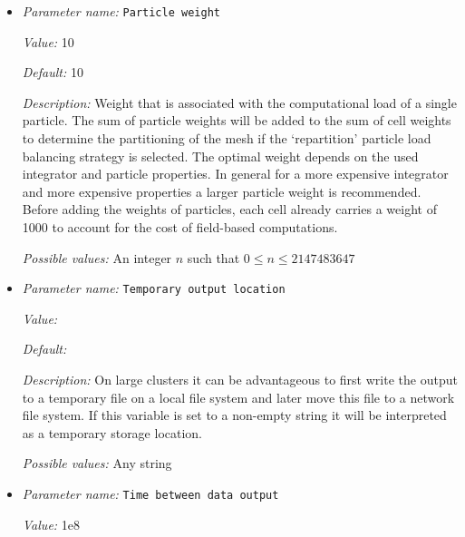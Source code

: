 \begin{itemize}
{\it Possible values:} Any one of ascii file, probability density function, quadrature points, random uniform, reference cell, uniform box, uniform radial
\item {\it Parameter name:} {\tt Particle weight}
\label{parameters:Postprocess/Particles/Particle weight}
\label{parameters:Postprocess/Particles/Particle_20weight}


{\it Value:} 10


{\it Default:} 10


{\it Description:} Weight that is associated with the computational load of a single particle. The sum of particle weights will be added to the sum of cell weights to determine the partitioning of the mesh if the `repartition' particle load balancing strategy is selected. The optimal weight depends on the used integrator and particle properties. In general for a more expensive integrator and more expensive properties a larger particle weight is recommended. Before adding the weights of particles, each cell already carries a weight of 1000 to account for the cost of field-based computations.


{\it Possible values:} An integer $n$ such that $0\leq n \leq 2147483647$
\item {\it Parameter name:} {\tt Temporary output location}
\label{parameters:Postprocess/Particles/Temporary output location}
\label{parameters:Postprocess/Particles/Temporary_20output_20location}


{\it Value:} 


{\it Default:} 


{\it Description:} On large clusters it can be advantageous to first write the output to a temporary file on a local file system and later move this file to a network file system. If this variable is set to a non-empty string it will be interpreted as a temporary storage location.


{\it Possible values:} Any string
\item {\it Parameter name:} {\tt Time between data output}
\label{parameters:Postprocess/Particles/Time between data output}
\label{parameters:Postprocess/Particles/Time_20between_20data_20output}


{\it Value:} 1e8



\end{itemize}
